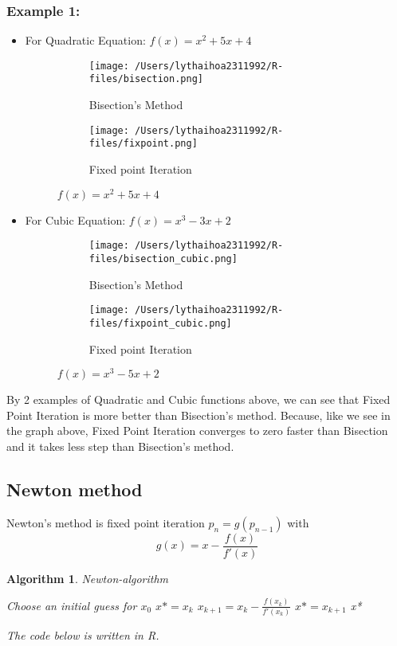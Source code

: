 \documentclass[12pt]{article}
\newtheorem{alg}[theorem]{Algorithm}
\begin{document}
\subsubsection{Example 1:}
\begin{itemize}
	\item For Quadratic Equation: $f(x) = x^2 +5x +4$
	\begin{figure}[H]
\begin{subfigure}{.5\textwidth}
  \centering
  \texttt{[image: /Users/lythaihoa2311992/R-files/bisection.png]}
  \caption{Bisection's Method}
  \label{fig:sfig1}
\end{subfigure}%
\begin{subfigure}{.5\textwidth}
  \centering
  \texttt{[image: /Users/lythaihoa2311992/R-files/fixpoint.png]}
  \caption{Fixed point Iteration}
  \label{fig:sfig2}
\end{subfigure}
\label{fig:fig}
\caption{$f(x) = x^2 +5x +4$}
\end{figure}

\item For Cubic Equation: $f(x) = x^3 -3x +2$
\begin{figure}[H]
\begin{subfigure}{.5\textwidth}
  \centering
  \texttt{[image: /Users/lythaihoa2311992/R-files/bisection\_cubic.png]}
  \caption{Bisection's Method}
  \label{fig:sfig1}
\end{subfigure}%
\begin{subfigure}{.5\textwidth}
  \centering
  \texttt{[image: /Users/lythaihoa2311992/R-files/fixpoint\_cubic.png]}
  \caption{Fixed point Iteration}
  \label{fig:sfig2}
\end{subfigure}
\label{fig:fig}
\caption{$f(x) = x^3 -5x +2$}
\end{figure}
\end{itemize}
By 2 examples of Quadratic and Cubic functions above, we can see that Fixed Point Iteration is more better than Bisection's method. Because, like we see in the graph above, Fixed Point Iteration converges to zero faster than Bisection and it takes less step than Bisection's method. 

\subsection{Newton method}
Newton's method is fixed point iteration $p_n = g(p_{n-1})$ with $$g(x) = x - \frac{f(x)}{f'(x)}$$
\begin{alg}{Newton-algorithm}
\begin{algorithmic}
Choose an initial guess for $x_0$
\State $x* = x_{k}$
\State $x_{k+1} = x_k - \frac{f(x_k)}{f'(x_k)}$
\State $x* = x_{k+1}$
\State \Return x*
\EndIf
\EndFor	
\end{algorithmic}
The code below is written in R.
	
\end{alg}
\end{document}
